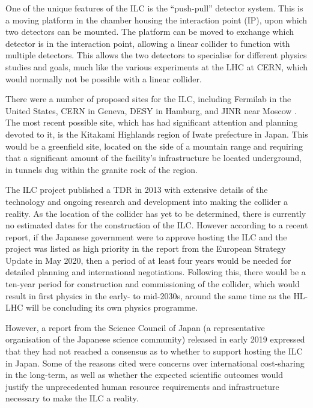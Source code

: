 One of the unique features of the \acrshort{ILC} is the ``push-pull'' detector system. This is a moving platform in the chamber housing the interaction point (\acrshort{IP}), upon which two detectors can be mounted. The platform can be moved to exchange which detector is in the interaction point, allowing a linear collider to function with multiple detectors. This allows the two detectors to specialise for different physics studies and goals, much like the various experiments at the \acrshort{LHC} at \acrshort{CERN}, which would normally not be possible with a linear collider.

There were a number of proposed sites for the \acrshort{ILC}, including Fermilab in the United States, \acrshort{CERN} in Geneva, \acrshort{DESY} in Hamburg, and \acrshort{JINR} near Moscow  . The most recent possible site, which has had significant attention and planning devoted to it, is the Kitakami Highlands region of Iwate prefecture in Japan. This would be a greenfield site, located on the side of a mountain range and requiring that a significant amount of the facility's infrastructure be located underground, in tunnels dug within the granite rock of the region. 

The \acrshort{ILC} project published a \acrfull{TDR} in 2013 \cite{ilc-tdr-summary} with extensive details of the technology and ongoing research and development into making the collider a reality. As the location of the collider has yet to be determined, there is currently no estimated dates for the construction of the \acrshort{ILC}. However according to a recent report\cite{ilc-timeline-2019}, if the Japanese government were to approve hosting the \acrshort{ILC} and the project was listed as high priority in the report from the European Strategy Update in May 2020, then a period of at least four years would be needed for detailed planning and international negotiations. Following this, there would be a ten-year period for construction and commissioning of the collider, which would result in first physics in the early- to mid-2030s, around the same time as the \acrshort{HL-LHC} will be concluding its own physics programme.

However, a report from the Science Council of Japan (a representative organisation of the Japanese science community) released in early 2019 expressed that they had not reached a consensus as to whether to support hosting the \acrshort{ILC} in Japan. Some  of the reasons cited were concerns over international cost-sharing in the long-term, as well as whether the expected scientific outcomes would justify the unprecedented human resource requirements and infrastructure necessary to make the \acrshort{ILC} a reality\cite{linearcolliders-scj-report}.

